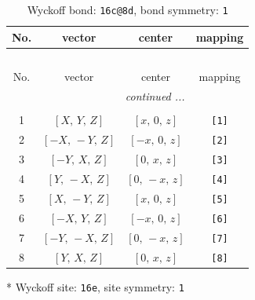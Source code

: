 \documentclass[fleqn,8pt]{jsarticle}
\begin{document}
\renewcommand{\arraystretch}{1.2}
\begin{longtable}{cccc}
\caption{Wyckoff bond: {\tt 16c@8d}, bond symmetry: {\tt 1}}
 \\
 \hline \hline
No. & vector & center & mapping \\ \hline \endfirsthead

\multicolumn{3}{l}{\tablename\ \thetable{}} \\
 \hline \hline
No. & vector & center & mapping \\ \hline \endhead

 \hline \hline
\multicolumn{3}{r}{\footnotesize\it continued ...} \\ \endfoot

 \hline \hline
\multicolumn{3}{r}{} \\ \endlastfoot

1 & $\left[ X,\, Y,\, Z \right]$ & $\left[ x,\, 0,\, z \right]$ & {\tt [1]} \\ \hline
2 & $\left[ - X,\, - Y,\, Z \right]$ & $\left[ - x,\, 0,\, z \right]$ & {\tt [2]} \\ \hline
3 & $\left[ - Y,\, X,\, Z \right]$ & $\left[ 0,\, x,\, z \right]$ & {\tt [3]} \\ \hline
4 & $\left[ Y,\, - X,\, Z \right]$ & $\left[ 0,\, - x,\, z \right]$ & {\tt [4]} \\ \hline
5 & $\left[ X,\, - Y,\, Z \right]$ & $\left[ x,\, 0,\, z \right]$ & {\tt [5]} \\ \hline
6 & $\left[ - X,\, Y,\, Z \right]$ & $\left[ - x,\, 0,\, z \right]$ & {\tt [6]} \\ \hline
7 & $\left[ - Y,\, - X,\, Z \right]$ & $\left[ 0,\, - x,\, z \right]$ & {\tt [7]} \\ \hline
8 & $\left[ Y,\, X,\, Z \right]$ & $\left[ 0,\, x,\, z \right]$ & {\tt [8]} \\
\end{longtable}
* Wyckoff site: {\tt 16e}, site symmetry: {\tt 1}
\renewcommand{\arraystretch}{1.2}
\end{document}
